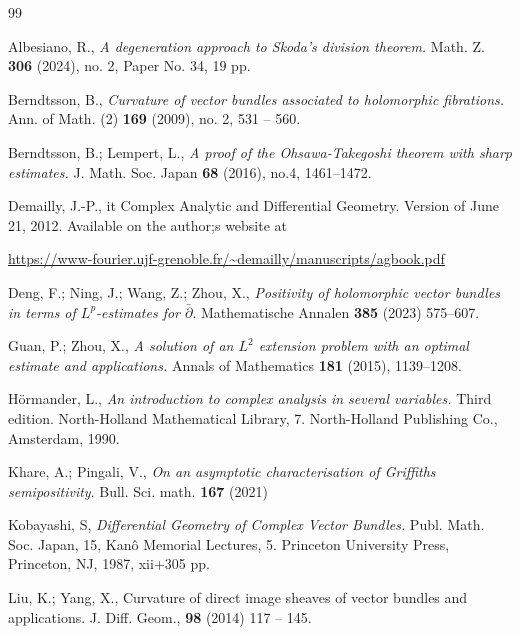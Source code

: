 \documentclass[12pt,hidelinks]{amsart}
\newcommand{\dbar}{\bar \partial}
\begin{document}
\begin{thebibliography}{99}

 Albesiano, R., {\it A degeneration approach to Skoda's division theorem.}  Math. Z. {\bf 306} (2024), no. 2, Paper No. 34, 19 pp.

  Berndtsson, B., {\it Curvature of vector bundles associated to holomorphic fibrations.}  Ann. of Math. (2) {\bf 169} (2009), no. 2, 531 -- 560.

 Berndtsson, B.; Lempert, L., {\it A proof of the Ohsawa-Takegoshi theorem with sharp estimates.}
J. Math. Soc. Japan {\bf 68} (2016), no.4, 1461--1472.


 Demailly, J.-P., {it Complex Analytic and Differential Geometry.}  Version of June 21, 2012.  Available on the author;s website at 

\url{https://www-fourier.ujf-grenoble.fr/~demailly/manuscripts/agbook.pdf}

  Deng, F.; Ning, J.; Wang, Z.; Zhou, X., {\it Positivity of holomorphic vector bundles in terms of $L^p$-estimates for $\dbar$}.  Mathematische Annalen {\bf 385} (2023) 575--607.

 Guan, P.; Zhou, X., {\it A solution of an $L^2$ extension problem with an optimal estimate and applications.}  Annals of Mathematics {\bf 181} (2015), 1139--1208.

 H\"ormander, L., {\it An introduction to complex analysis in several variables.} Third edition. North-Holland Mathematical Library, 7. North-Holland Publishing Co., Amsterdam, 1990.

 Khare, A.; Pingali, V., {\it On an asymptotic characterisation of Griﬃths semipositivity}.  Bull. Sci. math. {\bf 167} (2021)

 Kobayashi, S, {\it Differential Geometry of Complex Vector Bundles.}  Publ. Math. Soc. Japan, 15, Kan\^o Memorial Lectures, 5.  
Princeton University Press, Princeton, NJ, 1987, xii+305 pp.

 Liu, K.; Yang, X., {Curvature of direct image sheaves of vector bundles and applications.}  J. Diff. Geom., {\bf 98} (2014) 117 -- 145.


\end{thebibliography}
\end{document}
